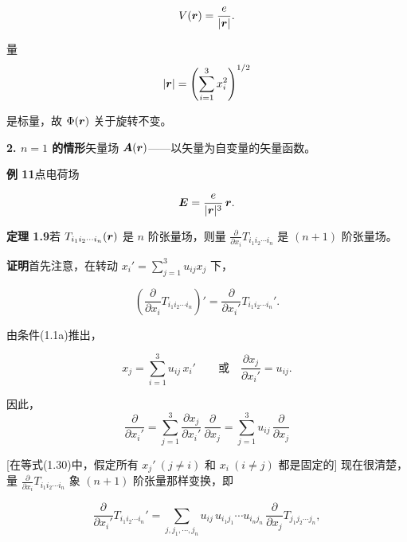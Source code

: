 \begin{equation*}
V(\bm{r}) = \frac{e}{|\bm{r}|}.
\end{equation*}

量
\begin{equation*}
|\bm{r}| = \left(\sum_{i=1}^{3} x_i^{2}\right)^{1/2}
\end{equation*}

是标量，故 $\Phi(\bm{r})$ 关于旋转不变。

\textbf{2. $n = 1$ 的情形}\quad 矢量场 $\bm{A}(\bm{r})$——以矢量为自变量的矢量函数。

\textbf{例 11}\quad 点电荷场

\begin{equation*}
\bm{E} = \frac{e}{|\bm{r}|^{3}}\, \bm{r}.
\end{equation*}

\textbf{定理 1.9}\quad 若 $T_{i_1 i_2 \cdots i_n}(\bm{r})$ 是 $n$ 阶张量场，则量 $\frac{\partial}{\partial x_i} T_{i_1 i_2 \cdots i_n}$ 是 $(n + 1)$ 阶张量场。

\textbf{证明}\quad 首先注意，在转动 $x_i' = \sum_{j=1}^{3} u_{ij} x_j$ 下，

\begin{equation*}
\left(\frac{\partial}{\partial x_i} T_{i_1 i_2 \cdots i_n}\right)' = \frac{\partial}{\partial x_i'} T_{i_1 i_2 \cdots i_n}'.
\end{equation*}

由条件(1.1a)推出，

\begin{equation*}
x_j = \sum_{i=1}^{3} u_{ij}\, x_i' \qquad \text{或} \quad \frac{\partial x_j}{\partial x_i'} = u_{ij}.
\end{equation*}

因此，
\begin{equation}
\frac{\partial}{\partial x_i'} = \sum_{j=1}^{3} \frac{\partial x_j}{\partial x_i'}\, \frac{\partial}{\partial x_j} = \sum_{j=1}^{3} u_{ij}\, \frac{\partial}{\partial x_j}
\tag{1.30}
\end{equation}

[在等式(1.30)中，假定所有 $x_j'\ (j \neq i)$ 和 $x_i\ (i \neq j)$ 都是固定的] 现在很清楚，量 $\frac{\partial}{\partial x_i} T_{i_1 i_2 \cdots i_n}$ 象 $(n + 1)$ 阶张量那样变换，即

\begin{equation*}
\frac{\partial}{\partial x_i'} T_{i_1 i_2 \cdots i_n}' = \sum_{j, j_1, \cdots, j_n} u_{ij}\, u_{i_1 j_1} \cdots u_{i_n j_n}\, \frac{\partial}{\partial x_j} T_{j_1 j_2 \cdots j_n},
\end{equation*}

